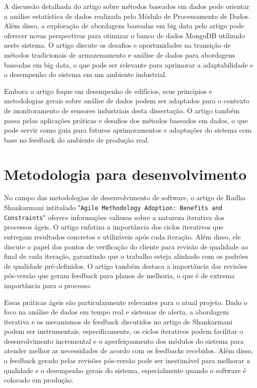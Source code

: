 A discussão detalhada do artigo sobre métodos baseados em dados pode orientar a análise estatística de dados realizada pelo Módulo de Processamento de Dados. Além disso, a exploração de abordagens baseadas em big data pelo artigo pode oferecer novas perspectivas para otimizar o banco de dados MongoDB utilizado neste sistema. O artigo discute os desafios e oportunidades na transição de métodos tradicionais de armazenamento e análise de dados para abordagens baseadas em big data, o que pode ser relevante para aprimorar a adaptabilidade e o desempenho do sistema em um ambiente industrial.

Embora o artigo foque em desempenho de edifícios, seus princípios e metodologias gerais sobre análise de dados podem ser adaptados para o contexto de monitoramento de sensores industriais desta dissertação. O artigo também passa pelas aplicações práticas e desafios dos métodos baseados em dados, o que pode servir como guia para futuros aprimoramentos e adaptações do sistema com base no feedback do ambiente de produção real.

\section{Metodologia para desenvolvimento}
No campo das metodologias de desenvolvimento de software, o artigo de Radha Shankarmani intitulado "\texttt{Agile Methodology Adoption: Benefits and Constraints}" \cite{shankarmani2012agile} oferece informações valiosas sobre a natureza iterativa dos processos ágeis. O artigo enfatiza a importância dos ciclos iterativos que entregam resultados concretos e utilizáveis após cada iteração. Além disso, ele discute o papel dos pontos de verificação do cliente para revisão de qualidade ao final de cada iteração, garantindo que o trabalho esteja alinhado com os padrões de qualidade pré-definidos. O artigo também destaca a importância das revisões pós-versão que geram feedback para planos de melhoria, o que é de extrema importância para o processo.

Essas práticas ágeis são particularmente relevantes para o atual projeto. Dado o foco na análise de dados em tempo real e sistemas de alerta, a abordagem iterativa e os mecanismos de feedback discutidos no artigo de Shankarmani podem ser instrumentais, especificamente, os ciclos iterativos podem facilitar o desenvolvimento incremental e o aperfeiçoamento dos módulos do sistema para atender melhor as necessidades de acordo com os feedbacks recebidos. Além disso, o feedback gerado pelas revisões pós-versão pode ser inestimável para melhorar a qualidade e o desempenho gerais do sistema, especialmente quando o software é colocado em produção.


